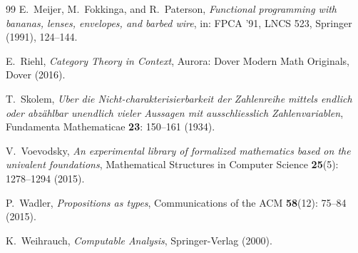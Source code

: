 \documentclass[12pt]{article}
\theoremstyle{definition}
\theoremstyle{remark}
\begin{document}
\begin{thebibliography}{99}
E.~Meijer, M.~Fokkinga, and R.~Paterson,
\textit{Functional programming with bananas, lenses, envelopes, and barbed wire},
in: FPCA '91, LNCS 523, Springer (1991), 124--144.

E.~Riehl,
\textit{Category Theory in Context},
Aurora: Dover Modern Math Originals, Dover (2016).

T.~Skolem,
\textit{Uber die Nicht-charakterisierbarkeit der Zahlenreihe mittels endlich oder abz\"ahlbar unendlich vieler Aussagen mit ausschliesslich Zahlenvariablen},
Fundamenta Mathematicae \textbf{23}: 150--161 (1934).

V.~Voevodsky,
\textit{An experimental library of formalized mathematics based on the univalent foundations},
Mathematical Structures in Computer Science \textbf{25}(5): 1278--1294 (2015).

P.~Wadler,
\textit{Propositions as types},
Communications of the ACM \textbf{58}(12): 75--84 (2015).

K.~Weihrauch,
\textit{Computable Analysis},
Springer-Verlag (2000).

\end{thebibliography}
\end{document}
